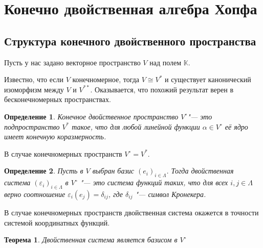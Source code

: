 \documentclass[a4paper, 12pt]{article}
\newtheorem*{definition}{Определение}
\newtheorem*{theorem}{\hspace*{\parindent}Теорема}
\theoremstyle{definition}
\begin{document}
\section{Конечно двойственная алгебра Хопфа}

\subsection{Структура конечного двойственного пространства}

Пусть у нас задано векторное пространство $V$ над полем $\mathbb{K}$. 

Известно, что если $V$ конечномерное, тогда $V \cong V^*$ и существует канонический изоморфизм между $V$ и $V^{**}$. Оказывается, что похожий результат верен в бесконечномерных пространствах. 

\begin{definition} 
Конечное двойственное пространство $V^\circ$"--- это подпространство $V^*$ такое, что для любой линейной функции $\alpha \in V^\circ$ её ядро имеет конечную коразмерность.
\end{definition}

В случае конечномерных пространств $V^\circ = V^*$.

\begin{definition}
    Пусть в $V$ выбран базис $(e_i)_{i \in \Lambda}$. Тогда 
    двойственная система $(\varepsilon_i)_{i \in \Lambda}$ в $V^\circ$ "--- это система функций  таких, что для всех $i, j \in \Lambda$ верно соотношение $\varepsilon_i(e_j) = \delta_{ij}$, где $\delta_{ij}$ "--- символ Кронекера.
\end{definition}

В случае конечномерных пространств двойственная система окажется в точности системой координатных функций. 

\begin{theorem}
    Двойственная система является базисом в $V^\circ$
\end{theorem}
\end{document}
